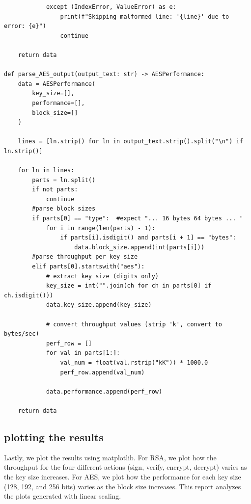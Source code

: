 \documentclass[11pt]{article}
\begin{document}
\begin{framed}
\begin{verbatim}
            except (IndexError, ValueError) as e:
                print(f"Skipping malformed line: '{line}' due to error: {e}")
                continue

    return data

def parse_AES_output(output_text: str) -> AESPerformance:
    data = AESPerformance(
        key_size=[],
        performance=[],
        block_size=[]
    )

    lines = [ln.strip() for ln in output_text.strip().split("\n") if ln.strip()]

    for ln in lines:
        parts = ln.split()
        if not parts:
            continue
        #parse block sizes
        if parts[0] == "type":  #expect "... 16 bytes 64 bytes ... "
            for i in range(len(parts) - 1):
                if parts[i].isdigit() and parts[i + 1] == "bytes":
                    data.block_size.append(int(parts[i]))
        #parse throughput per key size
        elif parts[0].startswith("aes"):
            # extract key size (digits only)
            key_size = int("".join(ch for ch in parts[0] if ch.isdigit()))
            data.key_size.append(key_size)

            # convert throughput values (strip 'k', convert to bytes/sec)
            perf_row = []
            for val in parts[1:]:
                val_num = float(val.rstrip("kK")) * 1000.0
                perf_row.append(val_num)

            data.performance.append(perf_row)

    return data
\end{verbatim}
\end{framed}

\subsection*{plotting the results}

Lastly, we plot the results using matplotlib. For RSA, we plot how the throughput for the four different actions (sign, verify, encrypt, decrypt) varies as the key size increases. For AES, we plot how the performance for each key size (128, 192, and 256 bits) varies as the block size increases. This report analyzes the plots generated with linear scaling.
\end{document}
